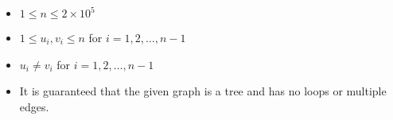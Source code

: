 \begin{itemize}
\tightlist
\item $1 \leq n \leq 2 \times 10 ^ 5$
\item $1 \leq u_i, v_i \leq n$ for $i = 1, 2, \ldots, n - 1$
\item $u_i \neq v_i$ for $i = 1, 2, \ldots, n - 1$
\item It is guaranteed that the given graph is a tree and has no loops or multiple edges.
\end{itemize}
